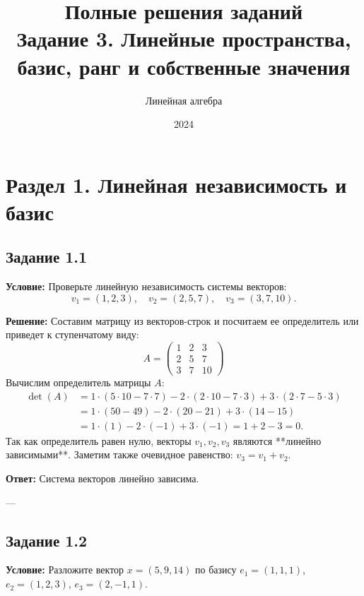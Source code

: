 \documentclass[11pt, a4paper]{article}
\title{\textbf{Полные решения заданий}\\ \large Задание 3. Линейные пространства, базис, ранг и собственные значения}
\author{Линейная алгебра}
\date{2024}
\begin{document}
\maketitle

\section{Раздел 1. Линейная независимость и базис}

\subsection*{Задание 1.1}
\textbf{Условие:} Проверьте линейную независимость системы векторов:
$$ v_1 = (1, 2, 3), \quad v_2 = (2, 5, 7), \quad v_3 = (3, 7, 10). $$

\textbf{Решение:}
Составим матрицу из векторов-строк и посчитаем ее определитель или приведет к ступенчатому виду:
$$ A = \begin{pmatrix} 1 & 2 & 3 \\ 2 & 5 & 7 \\ 3 & 7 & 10 \end{pmatrix} $$
Вычислим определитель матрицы $A$:
\begin{align*}
\det(A) &= 1 \cdot (5 \cdot 10 - 7 \cdot 7) - 2 \cdot (2 \cdot 10 - 7 \cdot 3) + 3 \cdot (2 \cdot 7 - 5 \cdot 3) \\
&= 1 \cdot (50 - 49) - 2 \cdot (20 - 21) + 3 \cdot (14 - 15) \\
&= 1 \cdot (1) - 2 \cdot (-1) + 3 \cdot (-1) = 1 + 2 - 3 = 0.
\end{align*}
Так как определитель равен нулю, векторы $v_1, v_2, v_3$ являются **линейно зависимыми**. Заметим также очевидное равенство: $v_3 = v_1 + v_2$.

\textbf{Ответ:} Система векторов линейно зависима.

---

\subsection*{Задание 1.2}
\textbf{Условие:} Разложите вектор $x = (5, 9, 14)$ по базису $e_1 = (1, 1, 1)$, $e_2 = (1, 2, 3)$, $e_3 = (2, -1, 1)$.
\end{document}
